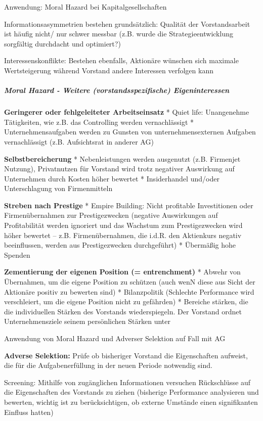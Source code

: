 \documentclass[
]{article}
\begin{document}
Anwendung: Moral Hazard bei Kapitalgesellschaften

Informationsasymmetrien bestehen grundsätzlich: Qualität der
Vorstandsarbeit ist häufig nicht/ nur schwer messbar (z.B. wurde die
Strategieentwicklung sorgfältig durchdacht und optimiert?)

Interessenskonflikte: Bestehen ebenfalls, Aktionäre wünschen sich
maximale Wertsteigerung während Vorstand andere Interessen verfolgen
kann

\hypertarget{moral-hazard---weitere-vorstandsspezifische-eigeninteressen}{%
\subparagraph{Moral Hazard - Weitere (vorstandsspezifische)
Eigeninteressen}\label{moral-hazard---weitere-vorstandsspezifische-eigeninteressen}}

\textbf{Geringerer oder fehlgeleiteter Arbeitseinsatz} * Quiet life:
Unangenehme Tätigkeiten, wie z.B. das Controlling werden vernachlässigt
* Unternehmensaufgaben werden zu Gunsten von unternehmensexternen
Aufgaben vernachlässigt (z.B. Aufsichtsrat in anderer AG)

\textbf{Selbstbereicherung} * Nebenleistungen werden ausgenutzt (z.B.
Firmenjet Nutzung), Privatnutzen für Vorstand wird trotz negativer
Auswirkung auf Unternehmen durch Kosten höher bewertet * Insiderhandel
und/oder Unterschlagung von Firmenmitteln

\textbf{Streben nach Prestige} * Empire Building: Nicht profitable
Investitionen oder Firmenübernahmen zur Prestigezwecken (negative
Auswirkungen auf Profitabilität werden ignoriert und das Wachstum zum
Prestigezwecken wird höher bewertet -- z.B. Firmenübernahmen, die i.d.R.
den Aktienkurs negativ beeinflussen, werden aus Prestigezwecken
durchgeführt) * Übermäßig hohe Spenden

\textbf{Zementierung der eigenen Position (= entrenchment)} * Abwehr von
Übernahmen, um die eigene Position zu schützen (auch wenN diese aus
Sicht der Aktionäre positiv zu bewerten sind) * Bilanzpolitik (Schlechte
Performance wird verschleiert, um die eigene Position nicht zu
gefährden) * Bereiche stärken, die die individuellen Stärken des
Vorstands wiederspiegeln. Der Vorstand ordnet Unternehmensziele seinem
persönlichen Stärken unter

Anwendung von Moral Hazard und Adverser Selektion auf Fall mit AG

\textbf{Adverse Selektion:} Prüfe ob bisheriger Vorstand die
Eigenschaften aufweist, die für die Aufgabenerfüllung in der neuen
Periode notwendig sind.

Screening: Mithilfe von zugänglichen Informationen versuchen
Rückschlüsse auf die Eigenschaften des Vorstands zu ziehen (bisherige
Performance analysieren und bewerten, wichtig ist zu berücksichtigen, ob
externe Umstände einen signifikanten Einfluss hatten)
\end{document}
